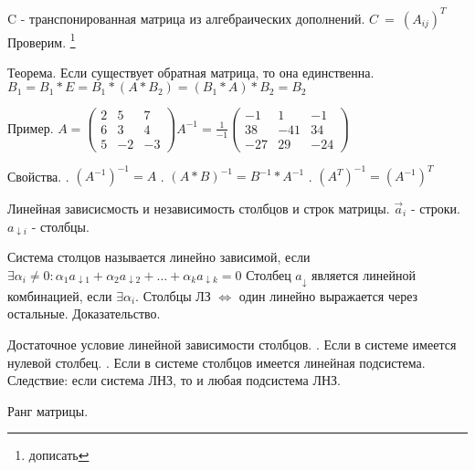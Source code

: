 \documentclass[12pt]{article}
\begin{document}
    C - транспонированная матрица из алгебраических дополнений. $C~=~(A_{ij})^T$ \newline
    Проверим. \footnote{дописать} \newline

    Теорема. \newline
    Если существует обратная матрица, то она единственна. \newline
    $B_1 = B_1 * E = B_1 * (A * B_2) = (B_1 * A) * B_2 = B_2$ \newline

    Пример. \newline
    $A = \begin{pmatrix}
        2 & 5 & 7 \\
        6 & 3 & 4 \\
        5 &-2 &-3
    \end{pmatrix}
    A^{-1} = \frac1{-1} \begin{pmatrix}
        -1 & 1 & -1 \\
        38 & -41 & 34 \\
        -27 & 29 & -24
    \end{pmatrix}
    $

    Свойства. . $(A^{-1})^{-1} = A$ . $(A * B)^{-1} = B^{-1} * A^{-1}$ . $(A^T)^{-1} = (A^{-1})^T$ \newline

    Линейная зависисмость и независимость столбцов и строк матрицы. \newline
    $\vec a_i$ - строки. \newline
    $a_{\downarrow i}$ - столбцы. \newline

    Система столцов называется линейно зависимой, если $\exists \alpha_i \not = 0: \alpha_1 a_{\downarrow 1} + \alpha_2 a_{\downarrow 2} + \dots + \alpha_k a_{\downarrow k} = 0$ \newline
    Столбец $a_{\downarrow}$ является линейной комбинацией, если $\exists \alpha_i$. \newline
    Столбцы ЛЗ $\Leftrightarrow$ один линейно выражается через остальные. \newline
    Доказательство. \newline

    Достаточное условие линейной зависимости столбцов. . Если в системе имеется нулевой столбец. . Если в системе столбцов имеется линейная подсистема. Следствие: если система ЛНЗ, то и любая подсистема ЛНЗ. \newline

    Ранг матрицы. \newline

    
\end{document}
